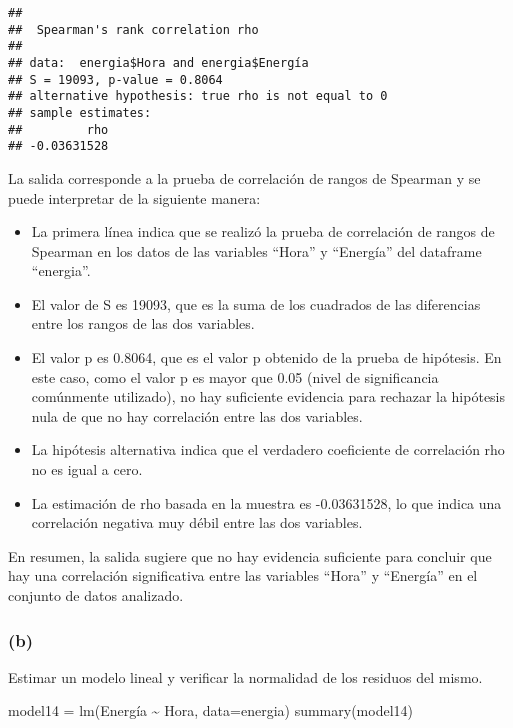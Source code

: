 \documentclass[
]{article}
\newenvironment{Shaded}{\begin{snugshade}}{\end{snugshade}}
\newcommand{\AttributeTok}[1]{\textcolor[rgb]{0.77,0.63,0.00}{#1}}
\newcommand{\FunctionTok}[1]{\textcolor[rgb]{0.00,0.00,0.00}{#1}}
\newcommand{\NormalTok}[1]{#1}
\newcommand{\OtherTok}[1]{\textcolor[rgb]{0.56,0.35,0.01}{#1}}
\newcommand{\SpecialCharTok}[1]{\textcolor[rgb]{0.00,0.00,0.00}{#1}}
\begin{document}
\begin{verbatim}
## 
##  Spearman's rank correlation rho
## 
## data:  energia$Hora and energia$Energía
## S = 19093, p-value = 0.8064
## alternative hypothesis: true rho is not equal to 0
## sample estimates:
##         rho 
## -0.03631528
\end{verbatim}

La salida corresponde a la prueba de correlación de rangos de Spearman y
se puede interpretar de la siguiente manera:

\begin{itemize}
\item
  La primera línea indica que se realizó la prueba de correlación de
  rangos de Spearman en los datos de las variables ``Hora'' y
  ``Energía'' del dataframe ``energia''.
\item
  El valor de S es 19093, que es la suma de los cuadrados de las
  diferencias entre los rangos de las dos variables.
\item
  El valor p es 0.8064, que es el valor p obtenido de la prueba de
  hipótesis. En este caso, como el valor p es mayor que 0.05 (nivel de
  significancia comúnmente utilizado), no hay suficiente evidencia para
  rechazar la hipótesis nula de que no hay correlación entre las dos
  variables.
\item
  La hipótesis alternativa indica que el verdadero coeficiente de
  correlación rho no es igual a cero.
\item
  La estimación de rho basada en la muestra es -0.03631528, lo que
  indica una correlación negativa muy débil entre las dos variables.
\end{itemize}

En resumen, la salida sugiere que no hay evidencia suficiente para
concluir que hay una correlación significativa entre las variables
``Hora'' y ``Energía'' en el conjunto de datos analizado.

\hypertarget{b-3}{%
\subsubsection{(b)}\label{b-3}}

Estimar un modelo lineal y verificar la normalidad de los residuos del
mismo.

\begin{Shaded}
\begin{Highlighting}[]
\NormalTok{model14 }\OtherTok{=} \FunctionTok{lm}\NormalTok{(Energía }\SpecialCharTok{\textasciitilde{}}\NormalTok{ Hora, }\AttributeTok{data=}\NormalTok{energia)}
\FunctionTok{summary}\NormalTok{(model14)}
\end{Highlighting}
\end{Shaded}
\end{document}
